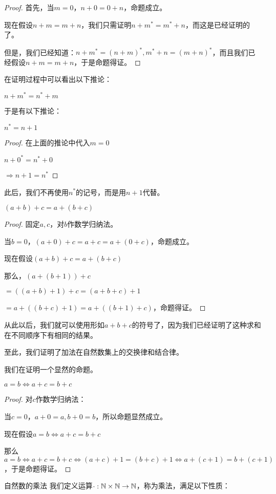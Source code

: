 \documentclass[12pt, a4paper, oneside, UTF8]{ctexbook}
\begin{document}
\begin{para}{0}
\begin{proof}
						首先，当$m=0$，$n+0=0+n$，命题成立。
						
						现在假设$n+m=m+n$，我们只需证明$n+m^*=m^*+n$，而这是已经证明的了。
						
						但是，我们已经知道：$n+m^*=(n+m)^*,m^*+n=(m+n)^*$，而且我们已经假设$n+m=m+n$，于是命题得证。
					\end{proof}
					在证明过程中可以看出以下推论：
					\begin{corollary}{}{}
						$n+m^*=n^*+m$
					\end{corollary}
					于是有以下推论：
					\begin{corollary}{}{}
						$n^*=n+1$
					\end{corollary}
					\begin{proof}
						在上面的推论中代入$m=0$
						
						$n+0^*=n^*+0$
						
						$\Rightarrow n+1=n^*$
					\end{proof}
					此后，我们不再使用$n^*$的记号，而是用$n+1$代替。
					\begin{proposition}
						$(a+b)+c=a+(b+c)$
					\end{proposition}
					\begin{proof}
						固定$a,c$，对$b$作数学归纳法。
						
						当$b=0$，$(a+0)+c=a+c=a+(0+c)$，命题成立。
						
						现在假设$(a+b)+c=a+(b+c)$
						
						那么，$\left(a+(b+1)\right)+c$
						
						$=\left((a+b)+1\right)+c=(a+b+c)+1$
						
						$=a+\left((b+c)+1\right)=a+\left((b+1)+c\right)$，命题得证。
					\end{proof}
					从此以后，我们就可以使用形如$a+b+c$的符号了，因为我们已经证明了这种求和在不同顺序下有相同的结果。
					
					至此，我们证明了加法在自然数集上的交换律和结合律。
					
					我们在证明一个显然的命题。
					\begin{proposition}{}
						$a = b \Leftrightarrow a+c=b+c$
					\end{proposition}
					\begin{proof}
						对$c$作数学归纳法：
						
						当$c=0$，$a+0=a,b+0=b$，所以命题显然成立。
						
						现在假设$a = b \Leftrightarrow a+c=b+c$
						
						那么$a=b\Leftrightarrow a+c=b+c \Leftrightarrow (a+c)+1=(b+c)+1 \Leftrightarrow a+(c+1)=b+(c+1)$，于是命题得证。
					\end{proof}
					\begin{defn}{自然数的乘法}
						我们定义运算$\cdot : \mathbb{N} \times \mathbb{N} \rightarrow \mathbb{N}$，称为乘法，满足以下性质：
						

\end{defn}
\end{para}
\end{document}
